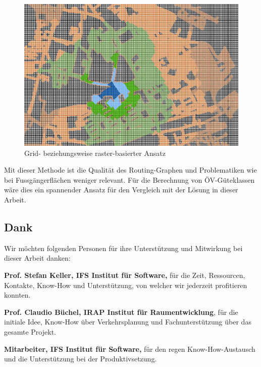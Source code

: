 \begin{figure}[ht]
    \centering
    \includegraphics[width=0.6\linewidth]{start/img/grid_based_approach.png}
    \caption[Grid- beziehungsweise raster-basierter Ansatz]{Grid- beziehungsweise raster-basierter Ansatz~\cite{pedestrian_accessibility_planning}}
    \label{fig:grid_based_approach}
\end{figure}

Mit dieser Methode ist die Qualität des Routing-Graphen und Problematiken wie bei Fussgängerflächen weniger relevant.
Für die Berechnung von \acs{ÖV}-Güteklassen wäre dies ein spannender Ansatz für den Vergleich mit der Lösung in dieser Arbeit.

\subsection{Dank}
\label{Resultate:Dank}

Wir möchten folgenden Personen für ihre Unterstützung und Mitwirkung bei dieser Arbeit danken:

\textbf{Prof. Stefan Keller, IFS Institut für Software,} für die Zeit, Ressourcen, Kontakte, Know-How und Unterstützung, von welcher wir jederzeit profitieren konnten.

\textbf{Prof. Claudio Büchel, IRAP Institut für Raumentwicklung}, für die initiale Idee, Know-How über Verkehrsplanung und Fachunterstützung über das gesamte Projekt.

\textbf{Mitarbeiter, IFS Institut für Software,} für den regen Know-How-Austausch und die Unterstützung bei der Produktivsetzung.
